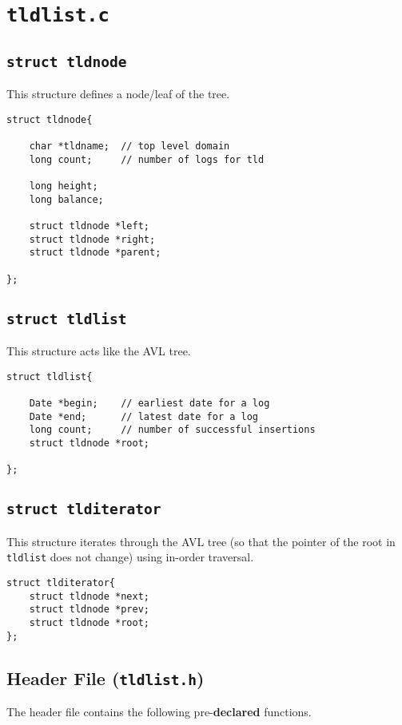 \documentclass{article}
\newcommand{\code}[1]{\texttt{#1}}
\begin{document}
\newpage

\section{\code{tldlist.c}}

\subsection{\code{struct tldnode}}
This structure defines a node/leaf of the tree.

\begin{verbatim}
struct tldnode{

    char *tldname;  // top level domain
    long count;     // number of logs for tld

    long height;
    long balance;

    struct tldnode *left;
    struct tldnode *right;
    struct tldnode *parent;

};
\end{verbatim}


\subsection{\code{struct tldlist}}
This structure acts like the AVL tree.

\begin{verbatim}
struct tldlist{

    Date *begin;    // earliest date for a log
    Date *end;      // latest date for a log
    long count;     // number of successful insertions
    struct tldnode *root;

};
\end{verbatim}


\subsection{\code{struct tlditerator}}
This structure iterates through the AVL tree (so that the pointer of the root in \code{tldlist} does not change) using in-order traversal.

\begin{verbatim}
struct tlditerator{
    struct tldnode *next;
    struct tldnode *prev;
    struct tldnode *root;
};
\end{verbatim}

\newpage

\subsection{Header File (\code{tldlist.h})}
The header file contains the following pre-\textbf{declared} functions.
\end{document}
